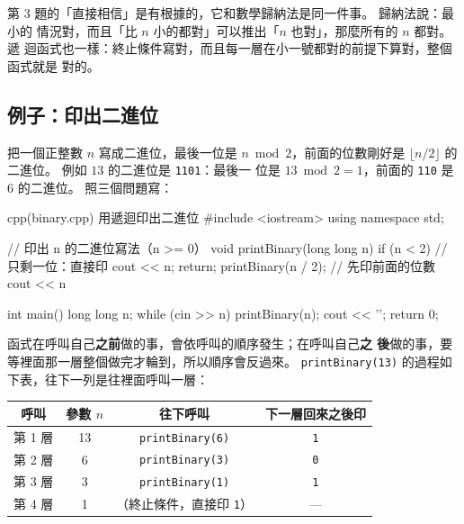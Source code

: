 第 3 題的「直接相信」是有根據的，它和數學歸納法是同一件事。 歸納法說：最小的
情況對，而且「比 $n$ 小的都對」可以推出「$n$ 也對」，那麼所有的 $n$ 都對。 遞
迴函式也一樣：終止條件寫對，而且每一層在小一號都對的前提下算對，整個函式就是
對的。

\subsection{例子：印出二進位}

把一個正整數 $n$ 寫成二進位，最後一位是 $n \bmod 2$，前面的位數剛好是
$\lfloor n/2 \rfloor$ 的二進位。 例如 $13$ 的二進位是 \texttt{1101}：最後一
位是 $13 \bmod 2 = 1$，前面的 \texttt{110} 是 $6$ 的二進位。 照三個問題寫：

\begin{example}[label=ex:rec-binary]{cpp}{(binary.cpp) 用遞迴印出二進位}
#include <iostream>
using namespace std;

// 印出 n 的二進位寫法（n >= 0）
void printBinary(long long n) {
    if (n < 2) {                 // 只剩一位：直接印
        cout << n;
        return;
    }
    printBinary(n / 2);          // 先印前面的位數
    cout << n %
}

int main() {
    long long n;
    while (cin >> n) {
        printBinary(n);
        cout << '\n';
    }
    return 0;
}
\end{example}


函式在呼叫自己\textbf{之前}做的事，會依呼叫的順序發生；在呼叫自己\textbf{之
後}做的事，要等裡面那一層整個做完才輪到，所以順序會反過來。 \texttt{printBinary(13)}
的過程如下表，往下一列是往裡面呼叫一層：

\begin{center}
\begin{tabular}{cccc}
\toprule
呼叫 & 參數 $n$ & 往下呼叫 & 下一層回來之後印 \\
\midrule
第 1 層 & 13 & \texttt{printBinary(6)} & \texttt{1} \\
第 2 層 & 6 & \texttt{printBinary(3)} & \texttt{0} \\
第 3 層 & 3 & \texttt{printBinary(1)} & \texttt{1} \\
第 4 層 & 1 & （終止條件，直接印 \texttt{1}） & --- \\
\bottomrule
\end{tabular}
\end{center}

